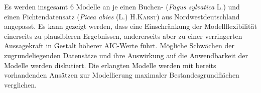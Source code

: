 {  Es werden insgesamt 6 Modelle an je einen Buchen- (\emph{Fagus sylvatica} L.) und einen Fichtendatensatz (\emph{Picea abies} (L.) H.\textsc{Karst}) aus Nordwestdeutschland angepasst.  Es kann gezeigt werden, dass eine Einschränkung der Modellflexibilität einerseits zu plausibleren Ergebnissen, andererseits aber zu einer verringerten Aussagekraft in Gestalt höherer AIC-Werte führt.  Mögliche Schwächen der zugrundeliegenden Datensätze und ihre Auswirkung auf die Anwendbarkeit der Modelle werden diskutiert.  Die erlangten Modelle werden mit bereits vorhandenden Ansätzen zur Modellierung maximaler Bestandesgrundflächen verglichen.

  
}
